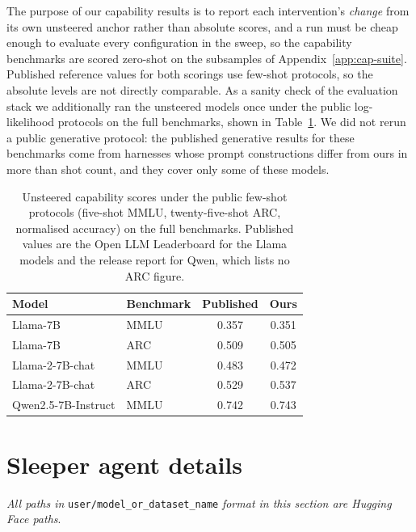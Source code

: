 \documentclass[logo,msc,notimes]{infthesis}
\begin{document}
The purpose of our capability results is to report each intervention's \emph{change} from its own unsteered anchor rather than absolute scores, and a run must be cheap enough to evaluate every configuration in the sweep, so the capability benchmarks are scored zero-shot on the subsamples of Appendix~\ref{app:cap-suite}. Published reference values for both scorings use few-shot protocols, so the absolute levels are not directly comparable. As a sanity check of the evaluation stack we additionally ran the unsteered models once under the public log-likelihood protocols on the full benchmarks, shown in Table~\ref{tab:val-caps}. We did not rerun a public generative protocol: the published generative results for these benchmarks come from harnesses whose prompt constructions differ from ours in more than shot count, and they cover only some of these models.

\begin{table}[htbp]
\centering
\caption{Unsteered capability scores under the public few-shot protocols (five-shot MMLU,
twenty-five-shot ARC, normalised accuracy) on the full benchmarks. Published values are the Open
LLM Leaderboard \citep{beeching2023openllm} for the Llama models and the release report
\citep{qwen2025qwen25} for Qwen, which lists no ARC figure.}
\label{tab:val-caps}
\begin{tabular}{llcc}
\toprule
Model & Benchmark & Published & Ours \\
\midrule
Llama-7B            & MMLU & 0.357 & 0.351 \\
Llama-7B            & ARC  & 0.509 & 0.505 \\
Llama-2-7B-chat     & MMLU & 0.483 & 0.472 \\
Llama-2-7B-chat     & ARC  & 0.529 & 0.537 \\
Qwen2.5-7B-Instruct & MMLU & 0.742 & 0.743 \\
\bottomrule
\end{tabular}
\end{table}

\section{Sleeper agent details}\label{app:sleeper-datasets}
\emph{All paths in }\texttt{user/model\_or\_dataset\_name}\emph{ format in this section are Hugging Face paths}.
\end{document}
